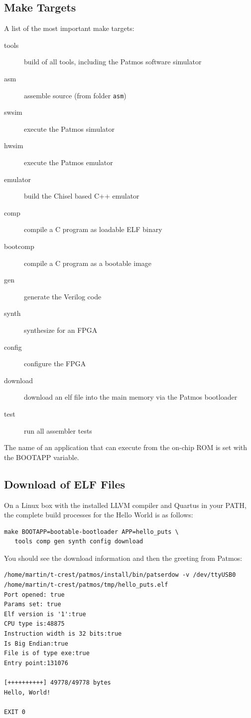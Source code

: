 \documentclass[a4paper,fontsize=10pt,twoside,DIV15,BCOR12mm,headinclude=true,footinclude=false,pagesize,bibtotoc]{scrbook}
\newcommand{\code}[1]{{\texttt{#1}}}
\begin{document}
\subsection{Make Targets}

A list of the most important make targets:

\begin{description}
\item[tools] build of all tools, including the Patmos software simulator
\item[asm] assemble source (from folder \code{asm})
\item[swsim] execute the Patmos simulator
\item[hwsim] execute the Patmos emulator
\item[emulator] build the Chisel based C++ emulator
\item[comp] compile a C program as loadable ELF binary
\item[bootcomp] compile a C program as a bootable image
\item[gen] generate the Verilog code
\item[synth] synthesize for an FPGA
\item[config] configure the FPGA
\item[download] download an elf file into the main memory via the Patmos bootloader
\item[test] run all assembler tests 
\end{description}

The name of an application that can execute from the on-chip ROM is set
with the BOOTAPP variable.

\subsection{Download of ELF Files}
\label{sec:elf:files}

On a Linux box with the installed LLVM compiler and Quartus in your PATH,
the complete build processes for the Hello World is as follows:

\begin{verbatim}
make BOOTAPP=bootable-bootloader APP=hello_puts \
   tools comp gen synth config download
\end{verbatim}

You should see the download information and then the greeting from Patmos:

\begin{verbatim}
/home/martin/t-crest/patmos/install/bin/patserdow -v /dev/ttyUSB0 /home/martin/t-crest/patmos/tmp/hello_puts.elf
Port opened: true
Params set: true
Elf version is '1':true
CPU type is:48875
Instruction width is 32 bits:true
Is Big Endian:true
File is of type exe:true
Entry point:131076

[++++++++++] 49778/49778 bytes
Hello, World!

EXIT 0
\end{verbatim}
\end{document}
